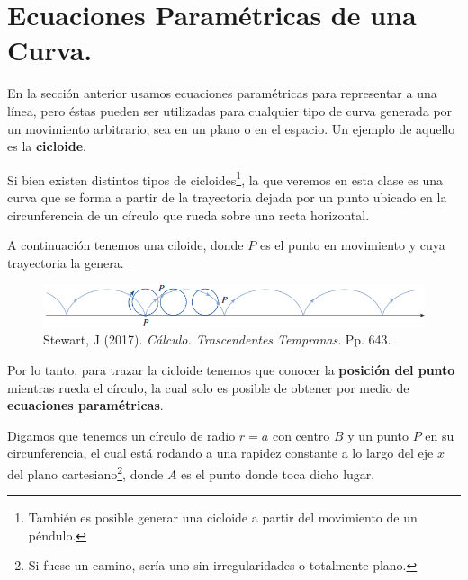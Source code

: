 \documentclass[12pt]{article}
\begin{document}
\section{Ecuaciones Paramétricas de una Curva.}

En la sección anterior usamos ecuaciones paramétricas para representar a una línea, pero éstas pueden ser utilizadas para cualquier tipo de curva generada por un movimiento arbitrario, sea en un plano o en el espacio. Un ejemplo de aquello es la \textbf{cicloide}.

Si bien existen distintos tipos de cicloides\footnote{También es posible generar una cicloide a partir del movimiento de un péndulo.}, la que veremos en esta clase es una curva que se forma a partir de la trayectoria dejada por un punto ubicado en la circunferencia de un círculo que rueda sobre una recta horizontal.

A continuación tenemos una ciloide, donde $P$ es el punto en movimiento y cuya trayectoria la genera.

\begin{figure}[hbt!]
\centering
\includegraphics[scale=0.7]{cycloid.png}
\caption{Stewart, J (2017). \textit{Cálculo. Trascendentes Tempranas}. Pp. 643.}
\end{figure}

Por lo tanto, para trazar la cicloide tenemos que conocer la \textbf{posición del punto} mientras rueda el círculo, la cual solo es posible de obtener por medio de \textbf{ecuaciones paramétricas}.

Digamos que tenemos un círculo de radio $r = a$ con centro $B$ y un punto $P$ en su circunferencia, el cual está rodando a una rapidez constante a lo largo del eje $x$ del plano cartesiano\footnote{Si fuese un camino, sería uno sin irregularidades o totalmente plano.}, donde $A$ es el punto donde toca dicho lugar.
\end{document}

